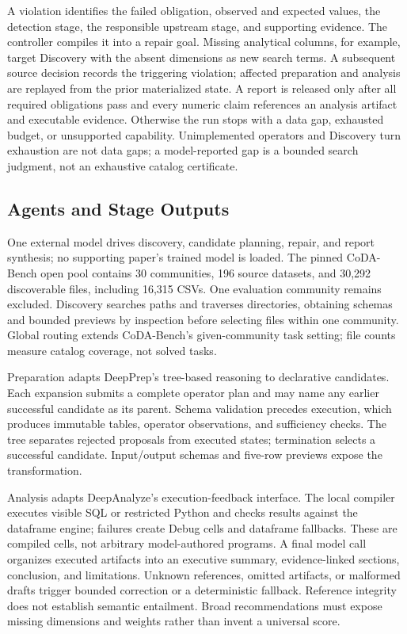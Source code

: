 \documentclass[sigconf, nonacm]{acmart}
\begin{document}
A violation identifies the failed obligation, observed and expected values,
the detection stage, the responsible upstream stage, and supporting evidence.
The controller compiles it into a repair goal.  Missing analytical columns, for
example, target Discovery with the absent dimensions as new search terms.  A
subsequent source decision records the triggering violation; affected
preparation and analysis are replayed from the prior materialized state.  A
report is released only after all required obligations pass and every numeric
claim references an analysis artifact and executable evidence.  Otherwise
the run stops with a data gap, exhausted budget, or unsupported capability.
Unimplemented operators and Discovery turn exhaustion are not data gaps;
a model-reported gap is a bounded search judgment, not an exhaustive catalog
certificate.

\subsection{Agents and Stage Outputs}

One external model drives discovery, candidate planning, repair, and report
synthesis; no supporting paper's trained model is loaded.
The pinned CoDA-Bench open pool contains 30 communities, 196 source datasets,
and 30,292 discoverable files, including 16,315 CSVs.  One evaluation community
remains excluded.  Discovery searches paths and traverses directories, obtaining
schemas and bounded previews by inspection before selecting files within one
community.  Global routing extends CoDA-Bench's given-community task setting;
file counts measure catalog coverage, not solved tasks.

Preparation adapts DeepPrep's tree-based reasoning to declarative candidates.
Each expansion submits a complete operator plan and may name any earlier
successful candidate as its parent.  Schema validation precedes execution,
which produces immutable tables, operator observations, and sufficiency checks.
The tree separates rejected proposals from executed states; termination selects
a successful candidate.  Input/output schemas and five-row previews expose
the transformation.

Analysis adapts DeepAnalyze's execution-feedback interface.  The local compiler
executes visible SQL or restricted Python and checks results against the
dataframe engine; failures create Debug cells and dataframe fallbacks.  These
are compiled cells, not arbitrary model-authored programs.  A final model call
organizes executed artifacts into an executive summary, evidence-linked
sections, conclusion, and limitations.  Unknown references, omitted artifacts,
or malformed drafts trigger bounded correction or a deterministic fallback.
Reference integrity does not establish semantic entailment.  Broad recommendations
must expose missing dimensions and weights rather than invent a universal score.
\end{document}
